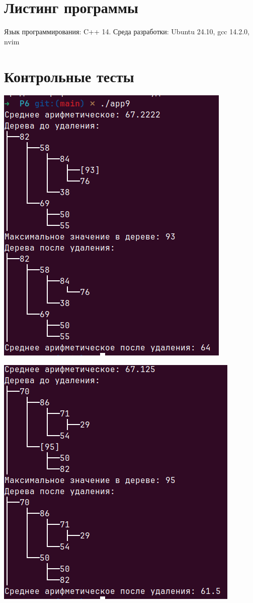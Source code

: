 \documentclass[a4paper,12pt]{article}
\begin{document}
	
	
	\newpage	
	\section{Листинг программы}
	Язык программирования: C++ 14. Среда разработки: Ubuntu 24.10, gcc 14.2.0, nvim
	
	

	\newpage
	\section{Контрольные тесты}
	
	\begin{center}
		\includegraphics[width=0.7\linewidth]{fig/fig1}
	\end{center}
	
	\begin{center}
		\includegraphics[width=0.7\linewidth]{fig/fig2}
	\end{center}
	
\end{document}
